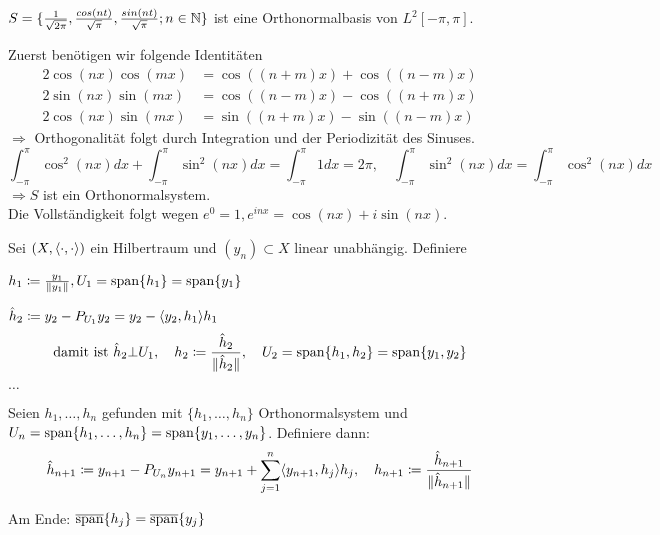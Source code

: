 \begin{beispiel}
	$S = \{ \frac{1}{\sqrt{2 \pi}}, \frac{cos(nt)}{\sqrt{\pi}}, \frac{sin(nt)}{\sqrt{\pi}}; n \in \mathbb{N} \}$ ist eine Orthonormalbasis von $L^{2}[-\pi, \pi]$.	
\end{beispiel}

\begin{beweis}
	Zuerst benötigen wir folgende Identitäten
	\begin{align*}
		2 \cos(nx) \cos(mx) & = \cos((n + m) x) + \cos( (n - m) x) \\
		2 \sin(nx) \sin(mx) & = \cos((n - m) x) - \cos( (n + m) x) \\
		2 \cos(nx) \sin(mx) & = \sin((n + m) x) - \sin( (n - m) x) 
	\end{align*}
	$\Rightarrow$ Orthogonalität folgt durch Integration und der Periodizität des Sinuses.
	\[ \int_{-\pi}^{\pi} \cos^{2}(nx) dx + \int_{-\pi}^{\pi} \sin^{2}(nx) dx = \int_{-\pi}^{\pi} 1 dx = 2 \pi, \quad \int_{-\pi}^{\pi} \sin^{2}(nx) dx = \int_{-\pi}^{\pi} \cos^{2}(nx) dx \]
	$\Rightarrow S$ ist ein Orthonormalsystem. \\
	Die Vollständigkeit folgt wegen $e^{0} = 1, e^{inx} = \cos(nx) + i \sin(nx)$.
\end{beweis}


\begin{anwendung} 
	Sei $(X, \langle \cdot, \cdot \rangle)$ ein Hilbertraum und $(y_{n}) \subset X$ linear unabhängig. Definiere
	\begin{description}
		\item $h_{1} \coloneqq \frac{y_{1}}{\| y_{1} \|}, U_{1} = \operatorname{span} \{ h_{1} \} = \operatorname{span} \{ y_{1} \}$
		\item $\hat{h}_{2} \coloneqq y_{2} - P_{U_{1}} y_{2} = y_{2} - \langle y_{2} , h_{1} \rangle h_{1}$
			\[ \text{damit ist } \hat{h}_{2} \bot U_{1}, \quad h_{2} \coloneqq \frac{\hat{h}_{2}}{\| \hat{h}_{2} \|}, \quad U_{2} = \operatorname{span} \{ h_{1}, h_{2} \} = \operatorname{span} \{ y_{1}, y_{2} \} \]
		\item $\dotsc$
		\item Seien $h_{1}, \dotsc, h_{n}$ gefunden mit $\{ h_{1}, \dotsc, h_{n} \}$ Orthonormalsystem und $U_{n} = \operatorname{span} \{ h_{1}, \dotsc, h_{n} \} = \operatorname{span} \{ y_{1}, \dotsc, y_{n} \}$. Definiere dann:
			\[ \hat{h}_{n + 1} \coloneqq y_{n + 1} - P_{U_{n}} y_{n + 1 } = y_{n + 1} + \sum_{j = 1}^{n} \langle y_{n + 1} , h_{j} \rangle h_{j}, \quad h_{n + 1} \coloneqq \frac{\hat{h}_{n + 1}}{\| \hat{h}_{n + 1} \|} \]
	\end{description}
	Am Ende: $\overline{\operatorname{span}}\{ h_{j} \} = \overline{\operatorname{span}}\{ y_{j} \}$
\end{anwendung}


